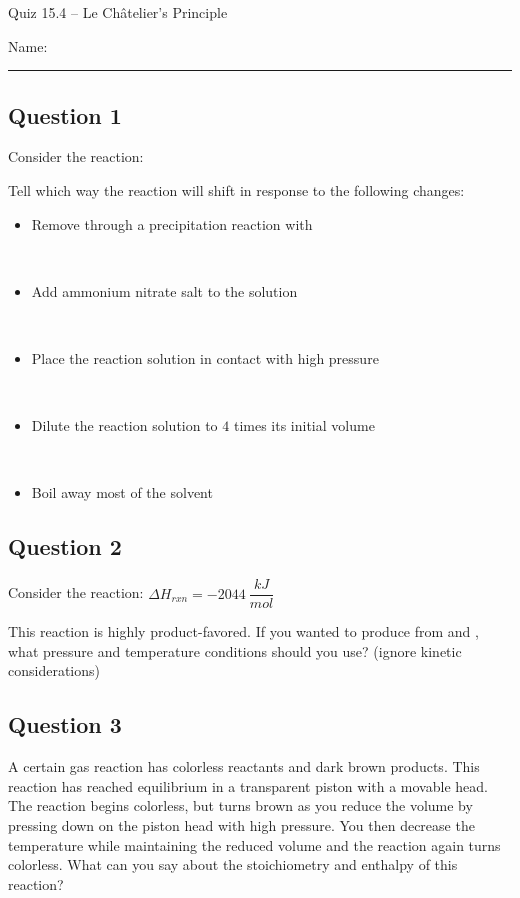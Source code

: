 \documentclass[11pt, letterpaper]{memoir}
\begin{document}
	\begin{center}
		{\large	Quiz 15.4 -- Le Ch\^atelier's Principle}
	\end{center}
	{\large Name: \rule[-1mm]{4in}{.1pt} 
	
	\subsection*{Question 1}
	Consider the reaction: 
	
	\noindent Tell which way the reaction will shift in response to the following changes:
	\begin{itemize}
		\item Remove  through a precipitation reaction with 
		
		~
		\item Add ammonium nitrate salt to the solution
		
		~
		\item Place the reaction solution in contact with high pressure 
		
		~
		\item Dilute the reaction solution to $4$ times its initial volume
		
		~
		\item Boil away most of the solvent
	\end{itemize}
	
	\vspace{1em}
	\subsection*{Question 2}
	Consider the reaction:  \hspace{1em} $\Delta H_{rxn}=-2044~\dfrac{kJ}{mol}$
	
	\noindent This reaction is highly product-favored. If you wanted to produce  from  and , what pressure and temperature conditions should you use? (ignore kinetic considerations)
	
	\vspace{4em}
	\subsection*{Question 3}
	A certain gas reaction has colorless reactants and dark brown products. This reaction has reached equilibrium in a transparent piston with a movable head. The reaction begins colorless, but turns brown as you reduce the volume by pressing down on the piston head with high pressure. You then decrease the temperature while maintaining the reduced volume and the reaction again turns colorless. What can you say about the stoichiometry and enthalpy of this reaction?
		
}
\end{document}
